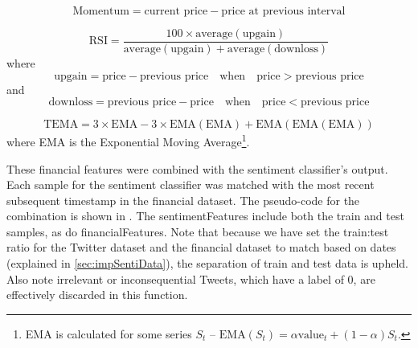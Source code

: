 \documentclass[12pt,a4paper,twoside,openright]{report}
\begin{document}
\begin{equation}
\text{Momentum} = \text{current price} - \text{price at previous interval}
\end{equation}

\begin{equation*}
\text{RSI} = \frac{100 \times \text{average}(\text{upgain})}{\text{average}(\text{upgain}) + \text{average}(\text{downloss})}
\end{equation*}
where
\begin{equation}
\text{upgain} = \text{price} - \text{previous price} \quad \text{when} \quad \text{price} > \text{previous price}
\end{equation}
and
\begin{equation*}
\text{downloss} = \text{previous price} - \text{price} \quad \text{when} \quad \text{price} < \text{previous price}
\end{equation*}

\begin{equation}
\text{TEMA} = 3 \times \text{EMA} - 3 \times \text{EMA}(\text{EMA}) + \text{EMA}(\text{EMA}(\text{EMA}))
\end{equation}
where EMA is the Exponential Moving Average\footnote{EMA is calculated for some series $S_t$ -- $\text{EMA}(S_t) = \alpha\text{value}_t + (1-\alpha)S_t$.}.

These financial features were combined with the sentiment classifier's output. Each sample for 
the sentiment classifier was matched with the most recent subsequent timestamp
in the financial dataset. The pseudo-code for the combination is shown
in . The sentimentFeatures include both the train
and test samples, as do financialFeatures. 
Note that because we have set the train:test ratio for the Twitter dataset
and the financial dataset to match based on dates (explained in \cref{sec:impSentiData}),
the separation of train and test data is upheld.
Also note irrelevant or inconsequential Tweets, which have a label of $0$,
are effectively discarded in this function.
\end{document}
